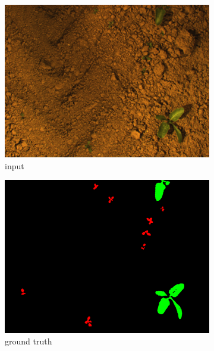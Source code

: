 \documentclass[letterpaper, 10 pt, conference]{ieeeconf}  %
\begin{document}
    
    \begin{figure}
    \centering
     \begin{subfigure}[b]{0.31\linewidth}
    \includegraphics[width=\linewidth]{pics/unsupervised/img_masks_8mm_fromImages_frame256.png}
   		\caption{input}
		\label{unsup_img}    		
   \end{subfigure}
        \begin{subfigure}[b]{0.31\linewidth}
    \includegraphics[width=\linewidth]{pics/unsupervised/gt_masks_8mm_fromImages_frame256_GroundTruth_iMap.png}
   		\caption{ground truth}
		\label{unsup_gt}    		
   \end{subfigure}
      \begin{subfigure}[b]{0.31\linewidth}

\end{subfigure}
\end{figure}
\end{document}

